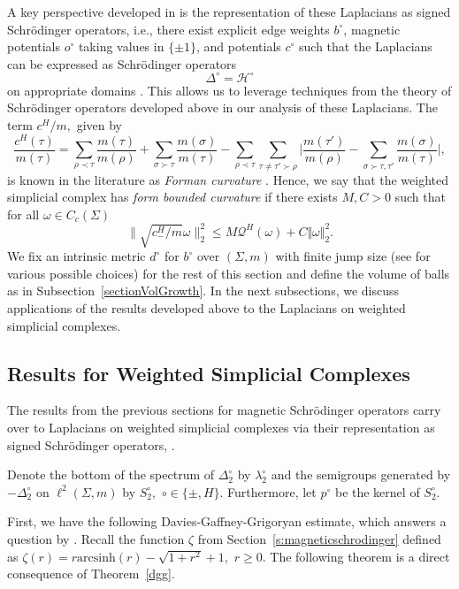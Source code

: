 \documentclass[10pt]{amsart}
\theoremstyle{definition}
\begin{document}
A key perspective developed in \cite{BK} is the representation of these Laplacians as signed Schr\"{o}dinger operators, i.e.,
there exist explicit edge weights $b^\circ$, magnetic potentials $o^\circ$ taking values in $\{\pm1\}$, and potentials $c^\circ$ such that the Laplacians can be expressed as Schr\"{o}dinger operators 
 \[\Delta^\circ = \mathcal{H}^\circ\] on appropriate domains \cite[Theorem~3.19]{BK}. This allows us to leverage techniques from the theory of Schr\"{o}dinger operators developed above in our analysis of these Laplacians. The term $c^H/m,$ given by 
\[\frac{c^H(\tau)}{m(\tau)} =  \sum_{\rho\prec\tau}\frac{m(\tau)}{m(\rho)}+\sum_{\sigma\succ\tau}\frac{m(\sigma)}{m(\tau)}-\sum_{\rho\prec\tau}\sum_{\tau\neq\tau'\succ\rho}\Big\vert\frac{m(\tau')}{m(\rho)}-\sum_{\sigma\succ\tau,\tau'}\frac{m(\sigma)}{m(\tau)}\Big\vert,\]
is known in the literature as \textit{Forman curvature} \cite{F,JM}. Hence, we say that the weighted simplicial complex has \textit{form bounded curvature} if there exists $M,C>0$ such that for all $\omega\in C_c( \Sigma)$
\[\|\sqrt{c^H_-\slash m}\omega\|^2_2\leq M\mathcal{Q}^H(\omega)+C\Vert\omega\Vert^2_2.\]
We fix an intrinsic metric $d^\circ$ for $b^\circ$ over $( \Sigma,m)$ with finite jump size (see \cite[Section~4 and Section~6]{BK} for various possible choices) for the rest of this section and define the volume of balls as in Subsection~\ref{sectionVolGrowth}. In the next subsections, we discuss applications of the results developed above to the Laplacians on weighted simplicial complexes.

\subsection{Results for Weighted Simplicial Complexes}
The results from the previous sections for magnetic Schrödinger operators carry over to Laplacians on weighted simplicial complexes via their representation as signed Schr\"{o}dinger operators, \cite[Lemma 3.13]{BK}. 


Denote the bottom of the spectrum of $\Delta^\circ_2$ by $\lambda^\circ_2$ and the semigroups generated by $-\Delta^\circ_2$ on $\ell^2( \Sigma,m)$ by $S^\circ_2,$  $\circ\in\{\pm,H\}.$ Furthermore, let $p^\circ$ be the kernel of $S^\circ_2.$
 
First, we have the following Davies-Gaffney-Grigoryan estimate, which answers a question by \cite[Remark 1.1]{HL}. Recall the function $\zeta$ from Section~\ref{s:magneticschrodinger} defined as $\zeta(r) =  r  \mathrm{arcsinh}\left({ r} \right)-\sqrt{1+ r^2}+1,$ $r\geq 0.$ The following theorem is a direct consequence of Theorem~\ref{dgg}.
\end{document}
